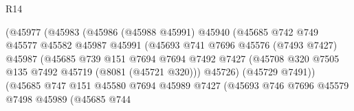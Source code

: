 \begin{lexlean}{R14}
\begin{coremodule}
                                    (@45977
                                      (@45983
                                        (@45986
                                          (@45988 @45991)
                                          @45940
                                          (@45685
                                            @742
                                            @749
                                            @45577
                                            @45582
                                            @45987
                                            @45991
                                            (@45693
                                              @741
                                              @7696
                                              @45576
                                              (@7493 @7427)
                                              @45987
                                              (@45685
                                                @739
                                                @151
                                                @7694
                                                @7694
                                                @7492
                                                @7427
                                                (@45708
                                                  @320
                                                  @7505
                                                  @135
                                                  @7492
                                                  @45719
                                                  (@8081 (@45721 @320)))
                                                @45726)
                                              (@45729 @7491))
                                            (@45685
                                              @747
                                              @151
                                              @45580
                                              @7694
                                              @45989
                                              @7427
                                              (@45693
                                                @746
                                                @7696
                                                @45579
                                                @7498
                                                @45989
                                                (@45685
                                                  @744

\end{coremodule}
\end{lexlean}
